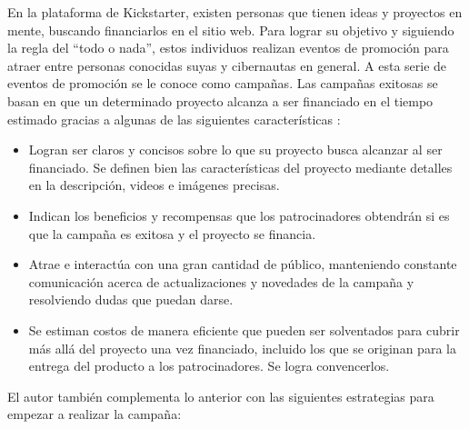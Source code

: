 En la plataforma de Kickstarter, existen personas que tienen ideas y proyectos en mente, buscando financiarlos en el sitio web. Para lograr su objetivo y siguiendo la regla del “todo o nada”, estos individuos realizan eventos de promoción para atraer entre personas conocidas suyas y cibernautas en general. A esta serie de eventos de promoción se le conoce como campañas. Las campañas exitosas se basan en que un determinado proyecto alcanza a ser financiado en el tiempo estimado gracias a algunas de las siguientes características \parencite{cr_kickstarter_intro}:

\begin{itemize}
	\item Logran ser claros y concisos sobre lo que su proyecto busca alcanzar al ser financiado. Se definen bien las características del proyecto mediante detalles en la descripción, videos e imágenes precisas.
	\item Indican los beneficios y recompensas que los patrocinadores obtendrán si es que la campaña es exitosa y el proyecto se financia.
	\item Atrae e interactúa con una gran cantidad de público, manteniendo constante comunicación acerca de actualizaciones y novedades de la campaña y resolviendo dudas que puedan darse.
	\item Se estiman costos de manera eficiente que pueden ser solventados para cubrir más allá del proyecto una vez financiado, incluido los que se originan para la entrega del producto a los patrocinadores. Se logra convencerlos.
\end{itemize}

El autor \cite{cr_yu2017kickstarter_course} también complementa lo anterior con las siguientes estrategias para empezar a realizar la campaña:

